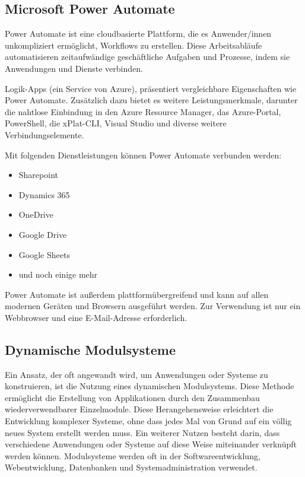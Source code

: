\subsection*{Microsoft Power Automate}

Power Automate ist eine cloudbasierte Plattform, die es Anwender/innen unkompliziert ermöglicht, 
Workflows zu erstellen. Diese Arbeitsabläufe automatisieren zeitaufwändige 
geschäftliche Aufgaben und Prozesse, indem sie Anwendungen und Dienste verbinden.

Logik-Apps (ein Service von Azure), 
präsentiert vergleichbare Eigenschaften wie Power Automate. Zusätzlich dazu 
bietet es weitere Leistungsmerkmale, darunter die nahtlose Einbindung in den 
Azure Resource Manager, das Azure-Portal, PowerShell, die xPlat-CLI, Visual Studio und 
diverse weitere Verbindungselemente.

Mit folgenden Dienstleistungen können Power Automate verbunden werden:

\begin{itemize}
    \item Sharepoint
    \item Dynamics 365
    \item OneDrive
    \item Google Drive
    \item Google Sheets
    \item und noch einige mehr
\end{itemize}

Power Automate ist außerdem plattformübergreifend und kann auf allen modernen Geräten und Browsern
ausgeführt werden. Zur Verwendung ist nur ein Webbrowser und eine E-Mail-Adresse erforderlich.

\newpage
\subsection*{Dynamische Modulsysteme}

Ein Ansatz, der oft angewandt wird, um Anwendungen oder Systeme zu konstruieren, 
ist die Nutzung eines dynamischen Modulsystems. Diese Methode ermöglicht die Erstellung 
von Applikationen durch den Zusammenbau wiederverwendbarer Einzelmodule. 
Diese Herangehensweise erleichtert die Entwicklung komplexer Systeme, ohne dass jedes 
Mal von Grund auf ein völlig neues System erstellt werden muss. Ein weiterer Nutzen besteht darin, 
dass verschiedene Anwendungen oder Systeme auf diese Weise miteinander verknüpft werden können.
Modulsysteme werden oft in der Softwareentwicklung, Webentwicklung, 
Datenbanken und Systemadministration verwendet.

